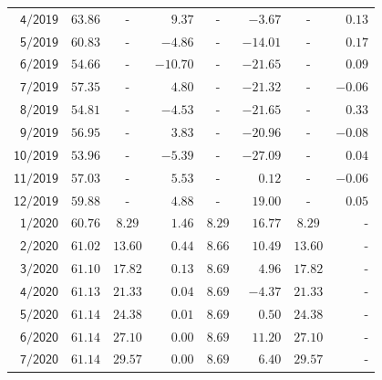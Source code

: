\documentclass[11pt,a4paper]{article}
\begin{document}
\begin{minipage}[t]{0.54\textwidth}
\begin{tabular}{rccrcrcr}
$\mathsf{4/2019}$ & $\mathsf{63.86}$ & - & $\mathsf{9.37}$ & - & $\mathsf{-3.67}$ & - & $\mathsf{0.13}$ \\
$\mathsf{5/2019}$ & $\mathsf{60.83}$ & - & $\mathsf{-4.86}$ & - & $\mathsf{-14.01}$ & - & $\mathsf{0.17}$ \\
$\mathsf{6/2019}$ & $\mathsf{54.66}$ & - & $\mathsf{-10.70}$ & - & $\mathsf{-21.65}$ & - & $\mathsf{0.09}$ \\
$\mathsf{7/2019}$ & $\mathsf{57.35}$ & - & $\mathsf{4.80}$ & - & $\mathsf{-21.32}$ & - & $\mathsf{-0.06}$ \\
$\mathsf{8/2019}$ & $\mathsf{54.81}$ & - & $\mathsf{-4.53}$ & - & $\mathsf{-21.65}$ & - & $\mathsf{0.33}$ \\
$\mathsf{9/2019}$ & $\mathsf{56.95}$ & - & $\mathsf{3.83}$ & - & $\mathsf{-20.96}$ & - & $\mathsf{-0.08}$ \\
$\mathsf{10/2019}$ & $\mathsf{53.96}$ & - & $\mathsf{-5.39}$ & - & $\mathsf{-27.09}$ & - & $\mathsf{0.04}$ \\
$\mathsf{11/2019}$ & $\mathsf{57.03}$ & - & $\mathsf{5.53}$ & - & $\mathsf{0.12}$ & - & $\mathsf{-0.06}$ \\
$\mathsf{12/2019}$ & $\mathsf{59.88}$ & - & $\mathsf{4.88}$ & - & $\mathsf{19.00}$ & - & $\mathsf{0.05}$ \\
\rowcolor{black!7}$\mathsf{1/2020}$ & $\mathsf{60.76}$ & $\mathsf{8.29}$ & $\mathsf{1.46}$ & $\mathsf{8.29}$ & $\mathsf{16.77}$ & $\mathsf{8.29}$ & - \\
\rowcolor{black!7}$\mathsf{2/2020}$ & $\mathsf{61.02}$ & $\mathsf{13.60}$ & $\mathsf{0.44}$ & $\mathsf{8.66}$ & $\mathsf{10.49}$ & $\mathsf{13.60}$ & - \\
\rowcolor{black!7}$\mathsf{3/2020}$ & $\mathsf{61.10}$ & $\mathsf{17.82}$ & $\mathsf{0.13}$ & $\mathsf{8.69}$ & $\mathsf{4.96}$ & $\mathsf{17.82}$ & - \\
\rowcolor{black!7}$\mathsf{4/2020}$ & $\mathsf{61.13}$ & $\mathsf{21.33}$ & $\mathsf{0.04}$ & $\mathsf{8.69}$ & $\mathsf{-4.37}$ & $\mathsf{21.33}$ & - \\
\rowcolor{black!7}$\mathsf{5/2020}$ & $\mathsf{61.14}$ & $\mathsf{24.38}$ & $\mathsf{0.01}$ & $\mathsf{8.69}$ & $\mathsf{0.50}$ & $\mathsf{24.38}$ & - \\
\rowcolor{black!7}$\mathsf{6/2020}$ & $\mathsf{61.14}$ & $\mathsf{27.10}$ & $\mathsf{0.00}$ & $\mathsf{8.69}$ & $\mathsf{11.20}$ & $\mathsf{27.10}$ & - \\
\rowcolor{black!7}$\mathsf{7/2020}$ & $\mathsf{61.14}$ & $\mathsf{29.57}$ & $\mathsf{0.00}$ & $\mathsf{8.69}$ & $\mathsf{6.40}$ & $\mathsf{29.57}$ & - \\

\end{tabular}
\end{minipage}
\end{document}
